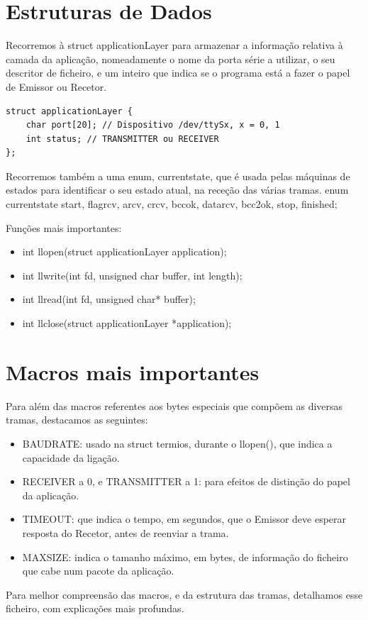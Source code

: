 \documentclass[article, a4paper, 11pt, oneside]{memoir}
\begin{document}
\section{Estruturas de Dados}
Recorremos à struct applicationLayer para armazenar a informação relativa à camada da aplicação, nomeadamente o nome da porta série a utilizar, o seu descritor de ficheiro, e um inteiro que indica se o programa está a fazer o papel de Emissor ou Recetor.

\begin{lstlisting}
struct applicationLayer {
	char port[20]; // Dispositivo /dev/ttySx, x = 0, 1
	int status; // TRANSMITTER ou RECEIVER
};
\end{lstlisting}

Recorremos também a uma enum, currentstate, que é usada pelas máquinas de estados para identificar o seu estado atual, na receção das várias tramas.
enum currentstate {start, flagrcv, arcv, crcv, bccok, datarcv, bcc2ok, stop, finished};

Funções mais importantes:
\begin{itemize}
	\item int llopen(struct applicationLayer application);
	\item int llwrite(int fd, unsigned char buffer, int length);
	\item int llread(int fd, unsigned char* buffer);
	\item int llclose(struct applicationLayer *application);
\end{itemize}

\section{Macros mais importantes}
Para além das macros referentes aos bytes especiais que compõem as diversas tramas, destacamos as seguintes:

\begin{itemize}
	\item BAUDRATE: usado na struct termios, durante o llopen(), que indica a capacidade da ligação.
	\item RECEIVER a 0, e TRANSMITTER a 1: para efeitos de distinção do papel da aplicação.
	\item TIMEOUT: que indica o tempo, em segundos, que o Emissor deve esperar resposta do Recetor, antes de reenviar a trama.
	\item MAX\textunderscore SIZE: indica o tamanho máximo, em bytes, de informação do ficheiro que cabe num pacote da aplicação.
\end{itemize}
Para melhor compreensão das macros, e da estrutura das tramas, detalhamos esse ficheiro, com explicações mais profundas.
\end{document}
